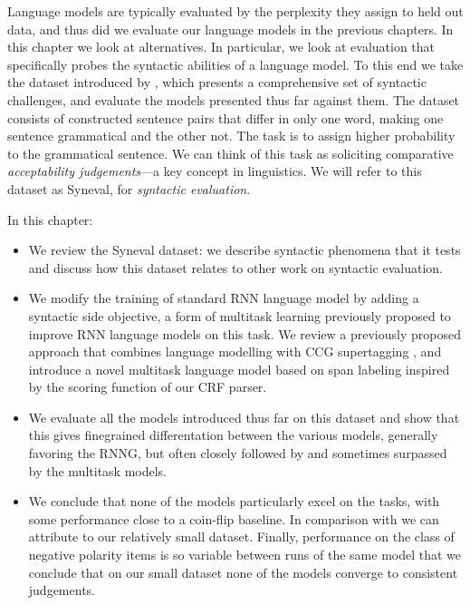 Language models are typically evaluated by the perplexity they assign to held out data, and thus did we evaluate our language models in the previous chapters. In this chapter we look at alternatives. In particular, we look at evaluation that specifically probes the syntactic abilities of a language model. To this end we take the dataset introduced by \citet{linzen2018targeted}, which presents a comprehensive set of syntactic challenges, and evaluate the models presented thus far against them. The dataset consists of constructed sentence pairs that differ in only one word, making one sentence grammatical and the other not. The task is to assign higher probability to the grammatical sentence. We can think of this task as soliciting comparative \textit{acceptability judgements}---a key concept in linguistics. We will refer to this dataset as Syneval, for \textit{syntactic evaluation}.

In this chapter:
\begin{itemize}
  \item We review the Syneval dataset: we describe syntactic phenomena that it tests and discuss how this dataset relates to other work on syntactic evaluation.
  \item We modify the training of standard RNN language model by adding a syntactic side objective, a form of multitask learning previously proposed to improve RNN language models on this task. We review a previously proposed approach that combines language modelling with CCG supertagging \citep{enguehard2017multitask}, and introduce a novel multitask language model based on span labeling inspired by the scoring function of our CRF parser.
  \item We evaluate all the models introduced thus far on this dataset and show that this gives finegrained differentation between the various models, generally favoring the RNNG, but often closely followed by and sometimes surpassed by the multitask models.
  \item We conclude that none of the models particularly excel on the tasks, with some performance close to a coin-flip baseline. In comparison with \citet{linzen2018targeted} we can attribute to our relatively small dataset. Finally, performance on the class of negative polarity items is so variable between runs of the same model that we conclude that on our small dataset none of the models converge to consistent judgements.
\end{itemize}

